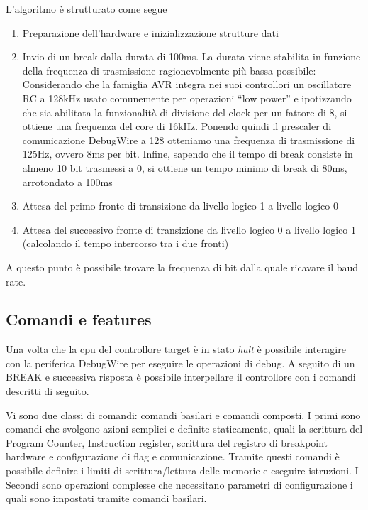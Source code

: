 L'algoritmo è strutturato come segue
\begin{enumerate}
    \item Preparazione dell'hardware e inizializzazione strutture dati
    \item Invio di un break dalla durata di 100ms. La durata viene stabilita in funzione della frequenza di trasmissione ragionevolmente più bassa possibile: Considerando che la famiglia AVR integra nei suoi controllori un oscillatore RC a 128kHz usato comunemente per operazioni ``low power'' e ipotizzando che sia abilitata la funzionalità di divisione del clock per un fattore di 8\cite[sec 9.11, tab 28-9]{avr:m328p}, si ottiene una frequenza del core di 16kHz. Ponendo quindi il prescaler di comunicazione DebugWire a 128 otteniamo una frequenza di trasmissione di 125Hz, ovvero 8ms per bit. Infine, sapendo che il tempo di break consiste in almeno 10 bit trasmessi a 0, si ottiene un tempo minimo di break di 80ms, arrotondato a 100ms
    \item Attesa del primo fronte di transizione da livello logico 1 a livello logico 0
    \item Attesa del successivo fronte di transizione da livello logico 0 a livello logico 1 (calcolando il tempo intercorso tra i due fronti)
\end{enumerate}

A questo punto è possibile trovare la frequenza di bit dalla quale ricavare il baud rate.

\subsection{Comandi e features}

Una volta che la cpu del controllore target è in stato \textit{halt} è possibile interagire con la periferica DebugWire per eseguire le operazioni di debug. A seguito di un BREAK e successiva risposta è possibile interpellare il controllore con i comandi descritti di seguito.

Vi sono due classi di comandi: comandi basilari e comandi composti.
I primi sono comandi che svolgono azioni semplici e definite staticamente, quali la scrittura del Program Counter, Instruction register, scrittura del registro di breakpoint hardware e configurazione di flag e comunicazione. Tramite questi comandi è possibile definire i limiti di scrittura/lettura delle memorie e eseguire istruzioni.
I Secondi sono operazioni complesse che necessitano parametri di configurazione i quali sono impostati tramite comandi basilari.

